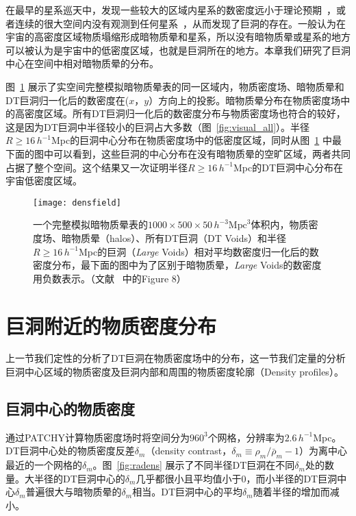 在最早的星系巡天中，发现一些较大的区域内星系的数密度远小于理论预期~\cite{KOS81}，或者连续的很大空间内没有观测到任何星系~\cite{LGH86,VGP94}，从而发现了巨洞的存在。一般认为在宇宙的高密度区域物质塌缩形成暗物质晕和星系，所以没有暗物质晕或星系的地方可以被认为是宇宙中的低密度区域，也就是巨洞所在的地方。本章我们研究了巨洞中心在空间中相对暗物质晕的分布。

图~\ref{fig:densfield} 展示了实空间完整模拟暗物质晕表的同一区域内，物质密度场、暗物质晕和DT巨洞归一化后的数密度在($x$，$y$）方向上的投影。暗物质晕分布在物质密度场中的高密度区域。所有DT巨洞归一化后的数密度分布与物质密度场也符合的较好，这是因为DT巨洞中半径较小的巨洞占大多数（图~\ref{fig:visual_all}）。半径$R \geq 16\,h^{-1}$Mpc的巨洞中心分布在物质密度场中的低密度区域，同时从图~\ref{fig:densfield} 中最下面的图中可以看到，这些巨洞的中心分布在没有暗物质晕的空旷区域，两者共同占据了整个空间。这个结果又一次证明半径$R \geq 16\,h^{-1}$Mpc的DT巨洞中心分布在宇宙低密度区域。

\begin{figure}
\centering
\texttt{[image: densfield]}
\caption{一个完整模拟暗物质晕表的$1000\times500\times50\,h^{-3}\mathrm{Mpc}^3$体积内，物质密度场、暗物质晕（halos）、所有DT巨洞（DT Voids）和半径$R \geq 16\,h^{-1}$Mpc的巨洞（\textit{Large} Voids）相对平均数密度归一化后的数密度分布，最下面的图中为了区别于暗物质晕，\textit{Large} Voids的数密度用负数表示。（文献 ~中的Figure 8）}
\label{fig:densfield}
\end{figure}

\section{巨洞附近的物质密度分布}

上一节我们定性的分析了DT巨洞在物质密度场中的分布，这一节我们定量的分析巨洞中心区域的物质密度及巨洞内部和周围的物质密度轮廓（Density profiles）。

\subsection{巨洞中心的物质密度}

通过\textsc{PATCHY}计算物质密度场时将空间分为$960^3$个网格，分辨率为$2.6\,h^{-1}$Mpc。DT巨洞中心处的物质密度反差$\delta_m$（density contrast，$\delta_m \equiv \rho_m / \bar{\rho}_m - 1$）为离中心最近的一个网格的$\delta_m$。图~\ref{fig:radens} 展示了不同半径DT巨洞在不同$\delta_m$处的数量。大半径的DT巨洞中心的$\delta_m$几乎都很小且平均值小于0，而小半径的DT巨洞中心$\delta_m$普遍很大与暗物质晕的$\delta_m$相当。DT巨洞中心的平均$\delta_m$随着半径的增加而减小。

